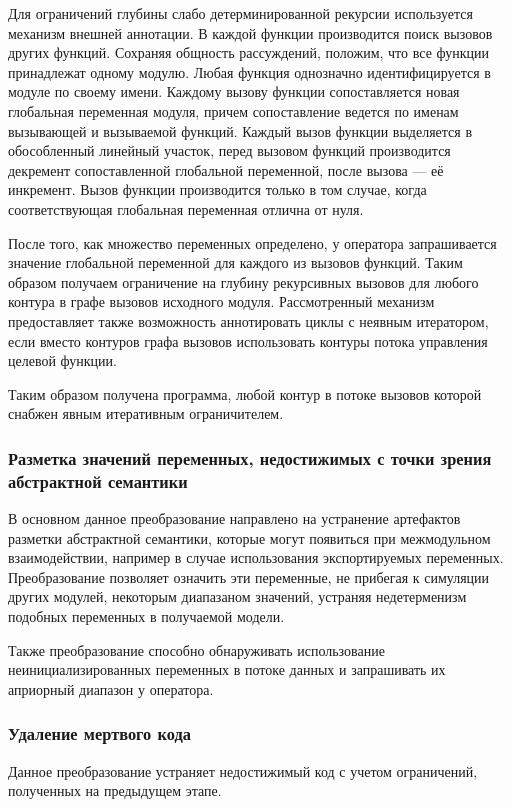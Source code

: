 \documentclass[12pt,a4paper]{article}
\begin{document}
Для ограничений глубины слабо детерминированной рекурсии используется механизм внешней аннотации. В каждой функции производится поиск вызовов других функций. Сохраняя общность рассуждений, положим, что все функции принадлежат одному модулю. Любая функция однозначно идентифицируется в модуле по своему имени. Каждому вызову функции сопоставляется новая глобальная переменная модуля, причем сопоставление ведется по именам вызывающей и вызываемой функций. Каждый вызов функции выделяется в обособленный линейный участок, перед вызовом функций производится декремент сопоставленной глобальной переменной, после вызова --- её инкремент. Вызов функции производится только в том случае, когда соответствующая глобальная переменная отлична от нуля.

После того, как множество переменных определено, у оператора запрашивается значение глобальной переменной для каждого из вызовов функций. Таким образом получаем ограничение на глубину рекурсивных вызовов для любого контура в графе вызовов исходного модуля. Рассмотренный механизм предоставляет также возможность аннотировать циклы с неявным итератором, если вместо контуров графа вызовов использовать контуры потока управления целевой функции.

Таким образом получена программа, любой контур в потоке вызовов которой снабжен явным итеративным ограничителем.

\subsubsection{Разметка значений переменных, недостижимых с точки зрения абстрактной семантики}

В основном данное преобразование направлено на устранение артефактов разметки абстрактной семантики, которые могут появиться при межмодульном взаимодействии, например в случае использования экспортируемых переменных. Преобразование позволяет означить эти переменные, не прибегая к симуляции других модулей, некоторым диапазаном значений, устраняя недетерменизм подобных переменных в получаемой модели.

Также преобразование способно обнаруживать использование неинициализированных переменных в потоке данных и запрашивать их априорный диапазон у оператора.

\subsubsection{Удаление мертвого кода}

Данное преобразование устраняет недостижимый код с учетом ограничений, полученных на предыдущем этапе.
\newpage
\end{document}
